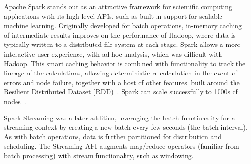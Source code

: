 \documentclass[conference]{IEEEtran}
\begin{document}
Apache Spark stands out as an attractive framework for scientific computing applications with its high-level APIs, such as built-in support for scalable machine learning. 
Originally developed for batch operations, in-memory caching of intermediate results improves on the performance of Hadoop, where data is typically written to a distributed file system at each stage.
Spark allows a more interactive user experience, with ad-hoc analysis, which was difficult with Hadoop. This smart caching behavior is combined with functionality to track the lineage of the calculations, allowing deterministic re-calculation in the event of errors and node failure, together with a host of other features, built around the Resilient Distributed Dataset (RDD)~\cite{Zaharia:2012:RDD:2228298.2228301}. 
Spark can scale successfully to 1000s of nodes~\cite{xinApacheSparkFastest2014}.


Spark Streaming was a later addition, leveraging the batch functionality for a streaming context by creating a new batch every few seconds (the batch interval). As with batch operations, data is further partitioned for distribution and scheduling. The Streaming API augments map/reduce operators (familiar from batch processing) with stream functionality, such as windowing. 




\end{document}
